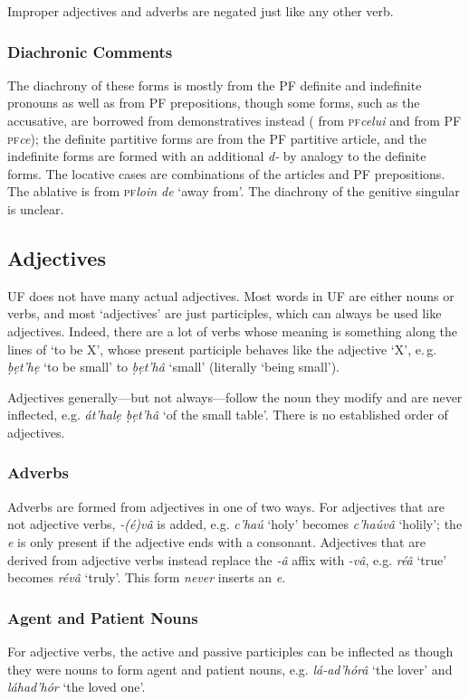 \documentclass[a4paper, 12pt, twoside, final]{article}
\def\pfabbr{{\normalfont\scshape pf\space}}
\def\pf#1{\pfabbr\textit{#1}}
\let \w \textit
\begin{document}
Improper adjectives and adverbs are negated just like any other verb.

\subsubsection{Diachronic Comments}
The diachrony of these forms is mostly from the PF definite and indefinite pronouns as well as from PF prepositions, though
some forms, such as the
accusative, are borrowed from demonstratives instead ( from \pf{celui} and  from PF \pf{ce}); the definite
partitive forms are from the PF partitive article, and
the indefinite forms are formed with an additional \w{d-} by analogy to the definite forms. The locative cases are combinations
of the articles and PF prepositions. The ablative is from \pf{loin de} ‘away from’. The diachrony of the genitive singular
is unclear.

\subsection{Adjectives}
UF does not have many actual adjectives. Most words in UF are either nouns or verbs, and most ‘adjectives’ are just
participles, which can always be used like adjectives. Indeed, there are a lot of verbs whose meaning is something
along the lines of ‘to be X’, whose present participle behaves like the adjective ‘X’, e.\,g. \w{ḅẹt’hẹ} ‘to be small’
to \w{ḅẹt’hâ} ‘small’ (literally ‘being small’).

Adjectives generally—but not always—follow the noun they modify and are never inflected, e.g. \w{át’halẹ ḅẹt’hâ} ‘of the small table’.
There is no established order of adjectives.

\subsubsection{Adverbs}
Adverbs are formed from adjectives in one of two ways. For adjectives that are not adjective verbs, \w{-(é)vâ} is added,
e.g. \w{c’haú} ‘holy’ becomes \w{c’haúvâ} ‘holily’; the \w{e} is only present if the adjective ends with a consonant. Adjectives that
are derived from adjective verbs instead replace the \w{-â} affix with \w{-vâ}, e.g. \w{réâ} ‘true’ becomes \w{révâ} ‘truly’. This
form \textit{never} inserts an \textit{e}.

\subsubsection{Agent and Patient Nouns}
For adjective verbs, the active and passive participles can be inflected as though they were nouns to form agent and
patient nouns, e.g. \w{lá-ad’hórâ} ‘the lover’ and \w{láhad’hór} ‘the loved one’.
\end{document}
